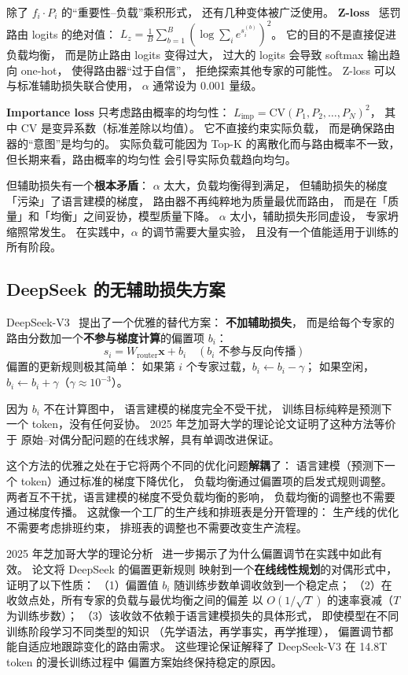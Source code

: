 除了 $f_i \cdot P_i$ 的“重要性--负载”乘积形式，
还有几种变体被广泛使用。
\textbf{Z-loss}~\cite{fedus2022switch} 惩罚路由 logits 的绝对值：
$L_z = \frac{1}{B} \sum_{b=1}^B (\log \sum_i e^{s_i^{(b)}})^2$。
它的目的不是直接促进负载均衡，
而是防止路由 logits 变得过大，
过大的 logits 会导致 softmax 输出趋向 one-hot，
使得路由器“过于自信”，
拒绝探索其他专家的可能性。
Z-loss 可以与标准辅助损失联合使用，
$\alpha$ 通常设为 0.001 量级。

\textbf{Importance loss} 只考虑路由概率的均匀性：
$L_{\text{imp}} = \text{CV}(P_1, P_2, \ldots, P_N)^2$，
其中 CV 是变异系数（标准差除以均值）。
它不直接约束实际负载，
而是确保路由器的“意图”是均匀的。
实际负载可能因为 Top-K 的离散化而与路由概率不一致，
但长期来看，路由概率的均匀性
会引导实际负载趋向均匀。

但辅助损失有一个\textbf{根本矛盾}：
$\alpha$ 太大，负载均衡得到满足，
但辅助损失的梯度「污染」了语言建模的梯度，
路由器不再纯粹地为质量最优而路由，
而是在「质量」和「均衡」之间妥协，模型质量下降。
$\alpha$ 太小，辅助损失形同虚设，
专家坍缩照常发生。
在实践中，$\alpha$ 的调节需要大量实验，
且没有一个值能适用于训练的所有阶段。

\subsection{DeepSeek 的无辅助损失方案}

DeepSeek-V3~\cite{deepseekv3} 提出了一个优雅的替代方案：
\textbf{不加辅助损失}，
而是给每个专家的路由分数加一个\textbf{不参与梯度计算}的偏置项 $b_i$：
\begin{equation}
  s_i = W_{\mathrm{router}} \mathbf{x} + b_i
  \quad (\text{$b_i$ 不参与反向传播})
\end{equation}
偏置的更新规则极其简单：
如果第 $i$ 个专家过载，$b_i \leftarrow b_i - \gamma$；
如果空闲，$b_i \leftarrow b_i + \gamma$（$\gamma \approx 10^{-3}$）。

因为 $b_i$ 不在计算图中，
语言建模的梯度完全不受干扰，
训练目标纯粹是预测下一个 token，没有任何妥协。
2025 年芝加哥大学的理论论文证明了这种方法等价于
原始--对偶分配问题的在线求解，具有单调改进保证。

这个方法的优雅之处在于它将两个不同的优化问题\textbf{解耦}了：
语言建模（预测下一个 token）通过标准的梯度下降优化，
负载均衡通过偏置项的启发式规则调整。
两者互不干扰，语言建模的梯度不受负载均衡的影响，
负载均衡的调整也不需要通过梯度传播。
这就像一个工厂的生产线和排班表是分开管理的：
生产线的优化不需要考虑排班约束，
排班表的调整也不需要改变生产流程。

2025 年芝加哥大学的理论分析~\cite{deepseekv3}
进一步揭示了为什么偏置调节在实践中如此有效。
论文将 DeepSeek 的偏置更新规则
映射到一个\textbf{在线线性规划}的对偶形式中，
证明了以下性质：
（1）偏置值 $b_i$ 随训练步数单调收敛到一个稳定点；
（2）在收敛点处，所有专家的负载与最优均衡之间的偏差
以 $O(1/\sqrt{T})$ 的速率衰减（$T$ 为训练步数）；
（3）该收敛不依赖于语言建模损失的具体形式，
即使模型在不同训练阶段学习不同类型的知识
（先学语法，再学事实，再学推理），
偏置调节都能自适应地跟踪变化的路由需求。
这些理论保证解释了 DeepSeek-V3
在 14.8T token 的漫长训练过程中
偏置方案始终保持稳定的原因。

